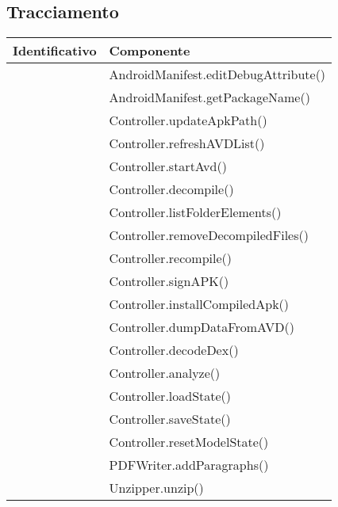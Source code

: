 \subsection{Tracciamento}\label{subsec:tracciamento-unitari}
\begin{center}
    \begin{longtable}{ |C{3cm} |C{10.5cm}|}
        \hline
        \textbf{Identificativo} &
        \textbf{Componente} \\\hline
         & AndroidManifest.editDebugAttribute()       \\\hline
         & AndroidManifest.getPackageName()           \\\hline
         & Controller.updateApkPath()                 \\\hline
         & Controller.refreshAVDList()                \\\hline
         & Controller.startAvd()                      \\\hline
         & Controller.decompile()                     \\\hline
         & Controller.listFolderElements()            \\\hline
         & Controller.removeDecompiledFiles()         \\\hline
         & Controller.recompile()                     \\\hline
         & Controller.signAPK()                       \\\hline
         & Controller.installCompiledApk()            \\\hline
         & Controller.dumpDataFromAVD()               \\\hline
         & Controller.decodeDex()                     \\\hline
         & Controller.analyze()                       \\\hline
         & Controller.loadState()                     \\\hline
         & Controller.saveState()                     \\\hline
         & Controller.resetModelState()               \\\hline
         & PDFWriter.addParagraphs()                  \\\hline
         & Unzipper.unzip()                           \\\hline

\end{longtable}
\end{center}
